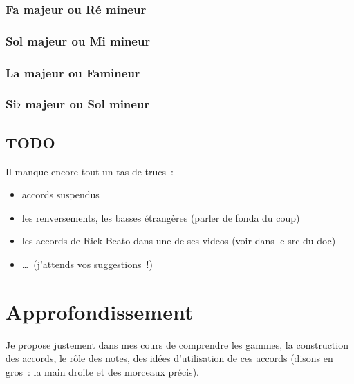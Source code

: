 \documentclass[11pt]{article}
\begin{document}
\subsubsection{Fa majeur ou Ré mineur}


\subsubsection{Sol majeur ou Mi mineur}


\subsubsection{La majeur ou Fa\shrp mineur}


\subsubsection{Si$\flat$ majeur ou Sol mineur}


\subsection{TODO}


Il manque encore tout un tas de trucs~:

\begin{itemize}
\item accords suspendus
\item les renversements, les basses étrangères (parler de fonda du coup)
\item les accords de Rick Beato dans une de ses videos (voir dans le src du doc)
\item \ldots~(j’attends vos suggestions~!)
\end{itemize}

\section{Approfondissement} \label{approf}

Je propose justement dans mes cours de comprendre les gammes, la construction
des accords, le rôle des notes, des idées d’utilisation de ces accords (disons
en gros~: la main droite et des morceaux précis).
\end{document}
